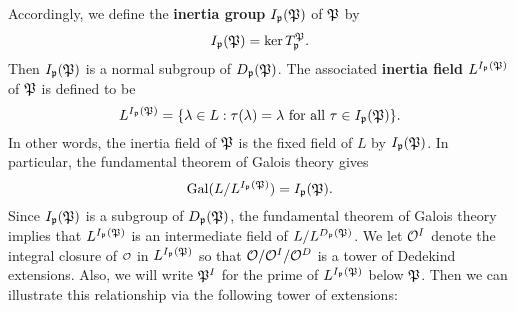     Accordingly, we define the \textbf{inertia group} $I_{\mathfrak{p}}(\mathfrak{P})$ of $\mathfrak{P}$ by
    \[
      I_{\mathfrak{p}}(\mathfrak{P}) = \ker{T_{\mathfrak{p}}^{\mathfrak{P}}}.
    \]
    Then $I_{\mathfrak{p}}(\mathfrak{P})$ is a normal subgroup of $D_{\mathfrak{p}}(\mathfrak{P})$. The associated \textbf{inertia field} $L^{I_{\mathfrak{p}}(\mathfrak{P})}$ of $\mathfrak{P}$ is defined to be
    \[
      L^{I_{\mathfrak{p}}(\mathfrak{P})} = \{\lambda \in L:\text{$\tau(\lambda) = \lambda$ for all $\tau \in I_{\mathfrak{p}}(\mathfrak{P})$}\}.
    \]
    In other words, the inertia field of $\mathfrak{P}$ is the fixed field of $L$ by $I_{\mathfrak{p}}(\mathfrak{P})$. In particular, the fundamental theorem of Galois theory gives
    \[
      \operatorname{\mathrm{Gal}}(L/L^{I_{\mathfrak{p}}(\mathfrak{P})}) = I_{\mathfrak{p}}(\mathfrak{P}).
    \]
    Since $I_{\mathfrak{p}}(\mathfrak{P})$ is a subgroup of $D_{\mathfrak{p}}(\mathfrak{P})$, the fundamental theorem of Galois theory implies that $L^{I_{\mathfrak{p}}(\mathfrak{P})}$ is an intermediate field of $L/L^{D_{\mathfrak{p}}(\mathfrak{P})}$. We let $\mathcal{O}^{I}$ denote the integral closure of $\smc{O}$ in $L^{I_{\mathfrak{p}}(\mathfrak{P})}$ so that $\mathcal{O}/\mathcal{O}^{I}/\mathcal{O}^{D}$ is a tower of Dedekind extensions. Also, we will write $\mathfrak{P}^{I}$ for the prime of $L^{I_{\mathfrak{p}}(\mathfrak{P})}$ below $\mathfrak{P}$. Then we can illustrate this relationship via the following tower of extensions:
    
    \begin{center}
    \end{center}

